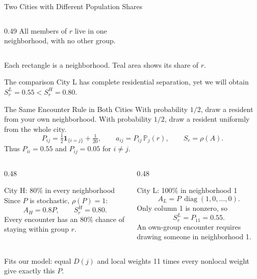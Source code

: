 \begin{frame}{Two Cities with Different Population Shares}
\begin{columns}[T]
\begin{column}{0.49\textwidth}
All members of $r$ live in one\\neighborhood, with no other group.
\end{column}
\end{columns}
\vspace{0.15cm}
{\footnotesize Each rectangle is a neighborhood. Teal area shows its share of $r$.}
\begin{block}{The comparison}
City L has complete residential separation, yet we will obtain
\alert{$S_r^{L}=0.55 < S_r^{H}=0.80$}.
\end{block}
\end{frame}

\begin{frame}{The Same Encounter Rule in Both Cities}
\small
With probability $1/2$, draw a resident from your own neighborhood.
With probability $1/2$, draw a resident uniformly from the whole city.
\[
 P_{ij}=\tfrac12\mathbf{1}_{\{i=j\}}+\tfrac1{20},
 \qquad
 a_{ij}=P_{ij}\,\mathbb{P}_j(r),
 \qquad S_r=\rho(A).
\]
Thus $P_{ii}=0.55$ and $P_{ij}=0.05$ for $i\ne j$.
\vspace{0.1cm}
\begin{columns}[T]
\begin{column}{0.48\textwidth}
\begin{block}{City H: 80\% in every neighborhood}
Since $P$ is stochastic, $\rho(P)=1$:
\[
 A_H=0.8P,\qquad \boxed{S_r^H=0.80.}
\]
Every encounter has an 80\% chance of staying within group $r$.
\end{block}
\end{column}
\begin{column}{0.48\textwidth}
\begin{block}{City L: 100\% in neighborhood 1}
\[
 A_L=P\,\operatorname{diag}(1,0,\ldots,0).
\]
Only column 1 is nonzero, so
\[
 \boxed{S_r^L=P_{11}=0.55.}
\]
An own-group encounter requires drawing someone in neighborhood 1.
\end{block}
\end{column}
\end{columns}
\vspace{0.1cm}
{\footnotesize Fits our model: equal $D(j)$ and local weights 11 times every
nonlocal weight give exactly this $P$.}
\end{frame}

